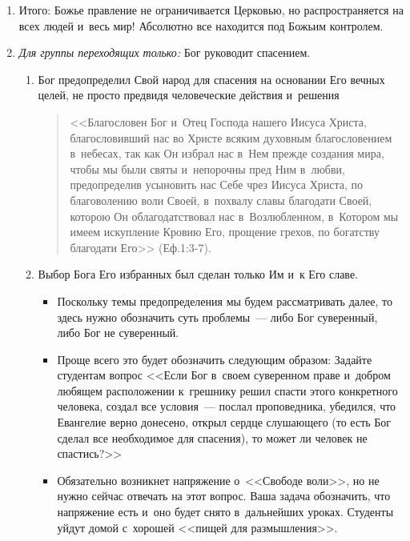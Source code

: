\documentclass[a4paper,12pt]{article}
\begin{document}
\begin{enumerate}
\begin{itemize}
\begin{enumerate}
\begin{enumerate}
\begin{quote}
            \end{quote}
        \end{enumerate}
        \item Итого: Божье правление не ограничивается Церковью, но распространяется на всех людей и~весь мир! Абсолютно все находится под Божьим контролем.
        \item \emph{Для группы переходящих только:} Бог руководит спасением.
        \begin{enumerate}
            \item Бог предопределил Свой народ для спасения на основании Его вечных целей, не просто предвидя человеческие действия и~решения 
            \begin{quote}
            <<Благословен Бог и~Отец Господа нашего Иисуса Христа, благословивший нас во Христе всяким духовным благословением в~небесах, так как Он избрал нас в~Нем прежде создания мира, чтобы мы были святы и~непорочны пред Ним в~любви, предопределив усыновить нас Себе чрез Иисуса Христа, по благоволению воли Своей, в~похвалу славы благодати Своей, которою Он облагодатствовал нас в~Возлюбленном, в~Котором мы имеем искупление Кровию Его, прощение грехов, по богатству благодати Его>> (Еф.1:3-7).
            \end{quote}
            \item Выбор Бога Его избранных был сделан только Им и~к Его славе.
            \begin{itemize}
                \item Поскольку темы предопределения мы будем рассматривать далее, то здесь нужно обозначить суть проблемы~--- либо Бог суверенный, либо Бог не суверенный. 
                \item Проще всего это будет обозначить следующим образом: Задайте студентам вопрос <<Если Бог в~своем суверенном праве и~добром любящем расположении к~грешнику решил спасти этого конкретного человека, создал все условия~--- послал проповедника, убедился, что Евангелие верно донесено, открыл сердце слушающего (то есть Бог сделал все необходимое для спасения), то может ли человек не спастись?>> 
                \item Обязательно возникнет напряжение о~<<Свободе воли>>, но не нужно сейчас отвечать на этот вопрос. Ваша задача обозначить, что напряжение есть и~оно будет снято в~дальнейших уроках. Студенты уйдут домой с~хорошей <<пищей для размышления>>.
            \end{itemize}
        \end{enumerate}
    \end{enumerate}
    \end{itemize}
\end{enumerate}
        
\end{document}
